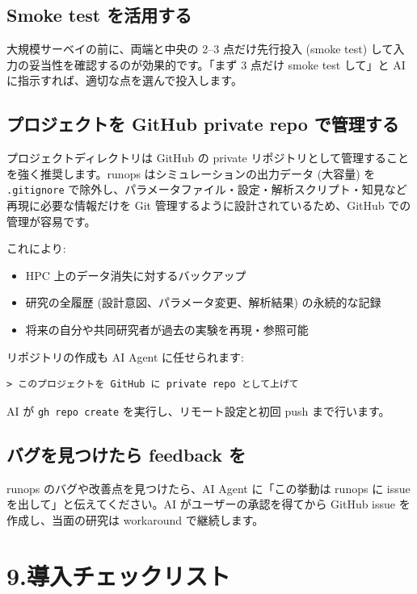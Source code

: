 \documentclass[a4paper,11pt]{article}
\begin{document}
\subsection*{\color{accent} Smoke test を活用する}

大規模サーベイの前に、両端と中央の 2--3 点だけ先行投入 (smoke test) して入力の妥当性を確認するのが効果的です。「まず 3 点だけ smoke test して」と AI に指示すれば、適切な点を選んで投入します。

\subsection*{\color{accent} プロジェクトを GitHub private repo で管理する}

プロジェクトディレクトリは GitHub の private リポジトリとして管理することを強く推奨します。runops はシミュレーションの出力データ (大容量) を \texttt{.gitignore} で除外し、パラメータファイル・設定・解析スクリプト・知見など再現に必要な情報だけを Git 管理するように設計されているため、GitHub での管理が容易です。

これにより:
\begin{itemize}[nosep]
  \item HPC 上のデータ消失に対するバックアップ
  \item 研究の全履歴 (設計意図、パラメータ変更、解析結果) の永続的な記録
  \item 将来の自分や共同研究者が過去の実験を再現・参照可能
\end{itemize}

リポジトリの作成も AI Agent に任せられます:

\begin{lstlisting}[language={},commentstyle={}]
> このプロジェクトを GitHub に private repo として上げて
\end{lstlisting}

AI が \texttt{gh repo create} を実行し、リモート設定と初回 push まで行います。

\subsection*{\color{accent} バグを見つけたら feedback を}

runops のバグや改善点を見つけたら、AI Agent に「この挙動は runops に issue を出して」と伝えてください。AI がユーザーの承認を得てから GitHub issue を作成し、当面の研究は workaround で継続します。

\section*{\color{darkblue} 9.\quad 導入チェックリスト}
\end{document}
